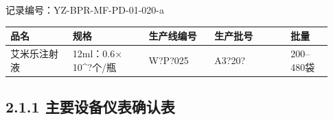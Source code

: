 \documentclass[UTF8,10pt,a4paper,fontset=fandol]{ctexart}
\newcommand{\fieldvalue}[1]{#1}
\newcommand{\handwritten}[1]{#1}
\begin{document}
\noindent
记录编号：YZ-BPR-MF-PD-01-020-a

\begin{center}
\begin{tabular}{|p{0.18\linewidth}|p{0.22\linewidth}|p{0.19\linewidth}|p{0.22\linewidth}|p{0.12\linewidth}|}
\hline
品名 & 规格 & 生产线编号 & 生产批号 & 批量 \\
\hline
\fieldvalue{艾米乐注射液}
&
\fieldvalue{12ml：0.6$\times$10^{?}个/瓶}
&
\fieldvalue{\handwritten{W?P?025}}
&
\fieldvalue{\handwritten{A3?20?}}
&
\fieldvalue{200--480袋}
\\
\hline
\end{tabular}
\end{center}

\subsection*{2.1.1 主要设备仪表确认表}
\end{document}

